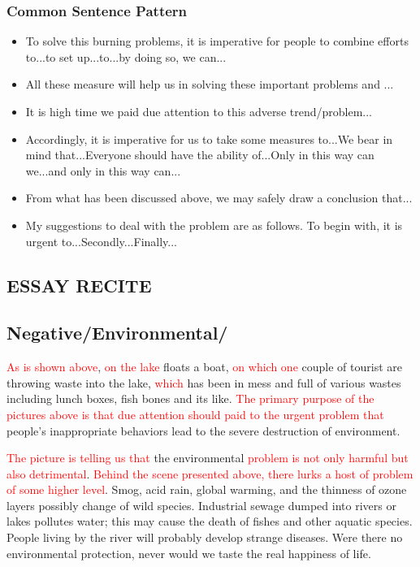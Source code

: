 \documentclass{article}
\begin{document}
\subsubsection{Common Sentence Pattern}
\label{sec:comm-beginn-sent-3}
\begin{itemize}
\item To solve this burning problems, it is imperative for people to combine efforts to...to set up...to...by doing so, we can...
\item All these measure will help us in solving these important problems and ...
\item It is high time we paid due attention to this adverse trend/problem...
\item Accordingly, it is imperative for us to take some measures to...We bear in mind
  that...Everyone should have the ability of...Only in this way can we...and only in this
  way can...
\item From what has been discussed above, we may safely draw a conclusion that...
\item My suggestions to deal with the problem are as follows. To begin with, it is urgent
  to...Secondly...Finally...
\end{itemize}



\begin{center}
  \section{ESSAY RECITE}
\label{sec:essay}
\end{center}

\subsection{Negative/Environmental/}
\label{sec:negative}

\hspace{0.5cm}\textcolor{red}{As is shown above}, \textcolor{red}{on the lake }floats a
boat, \textcolor{red}{on which one }couple of tourist are throwing waste into the lake,
\textcolor{red}{which} has been in mess and full of various wastes including lunch boxes,
fish bones and its like. \textcolor{red}{The primary purpose of the pictures above is that
due attention should paid to the urgent problem that }people's inappropriate behaviors
lead to the severe destruction of environment.

\par \textcolor{red}{The picture is telling us that} the environmental \textcolor{red}{problem is 
not only harmful but also detrimental}. \textcolor{red}{Behind the scene presented above,
there lurks a host of problem of some higher level}. Smog, acid rain, global warming, and
the thinness of ozone layers possibly change of wild species. Industrial sewage dumped
into rivers or lakes pollutes water; this may cause the death of fishes and other aquatic
species. People living by the river will probably develop strange diseases. Were there no
environmental protection, never would we taste the real happiness of life.
\end{document}
